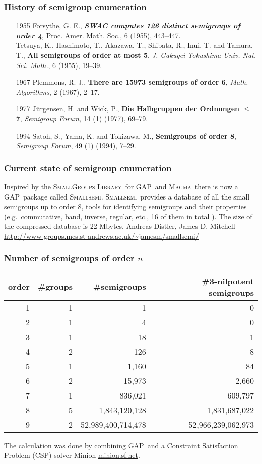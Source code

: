 \documentclass{beamer}
\newcommand{\Magma}{\textsc{Magma}}
\newcommand{\GAP}{\textsc{GAP}}
\newcommand{\Smallsemi}{\textsc{Smallsemi}}
\newcommand{\jump}{\vskip6pt}
\newcommand{\jmp}{\vskip3pt}
\begin{document}
\begin{frame}\frametitle{History of semigroup enumeration}
\begin{enumerate}
\item[1955] Forsythe, G. E., \textbf{\emph{SWAC computes 126 distinct semigroups of order 4}}, Proc. Amer. Math. Soc., 6 (1955), 443--447.
\\\vskip6pt
Tetsuya, K., Hashimoto, T., Akazawa, T., Shibata, R., Inui, T. and Tamura, T., \textbf{{All semigroups of order at most 5}}, \emph{J. Gakugei Tokushima Univ. Nat. Sci. Math.}, 6 (1955), 19--39.
\item[1967] Plemmons, R. J., \textbf{There are 15973 semigroups of order 6}, \emph{Math. Algorithms}, 2 (1967), 2--17. 
\item[1977]J\"urgensen, H. and Wick, P., \textbf{Die Halbgruppen der Ordnungen  $\mathbf{\leq}$ 7}, \emph{Semigroup Forum}, 14 (1) (1977), 69--79.
\item[1994]Satoh, S., Yama, K. and Tokizawa, M., \textbf{Semigroups of order 8}, \emph{Semigroup Forum}, 49 (1) (1994), 7--29.  
\end{enumerate}
\end{frame}

\begin{frame}\frametitle{Current state of semigroup enumeration}
Inspired by the  \textsc{SmallGroups Library}\ for \GAP\ and \Magma\ there is now a \GAP\ package called \Smallsemi.
\jump
\Smallsemi\ provides a database of all the small semigroups up to order 8, tools for identifying semigroups and their properties (e.g.\ commutative, band, inverse, regular, etc., 16 of them in total ).  
\jump
The size of the compressed database is 22 Mbytes.
\jump
Andreas Distler, James D. Mitchell
\jmp
\url{http://www-groups.mcs.st-andrews.ac.uk/~jamesm/smallsemi/}
\end{frame}


\begin{frame}\frametitle{Number of semigroups of order $n$}
\begin{center}
\begin{tabular}{r|r|r|r}
order & \#groups &\#semigroups &\#3-nilpotent semigroups \\
\hline
1&1&1 &0\\
2&1&4 &0\\
3&1&18&1\\
4&2&126&8\\
5&1&1,160&84\\
6&2&15,973&2,660\\
7&1&836,021&609,797\\
8&5&1,843,120,128&1,831,687,022\\
9&2&52,989,400,714,478&52,966,239,062,973
\end{tabular}
\end{center}
The calculation was done by combining \GAP\ and a Constraint Satisfaction Problem (CSP) solver Minion \url{minion.sf.net}.
\end{frame}
\end{document}
